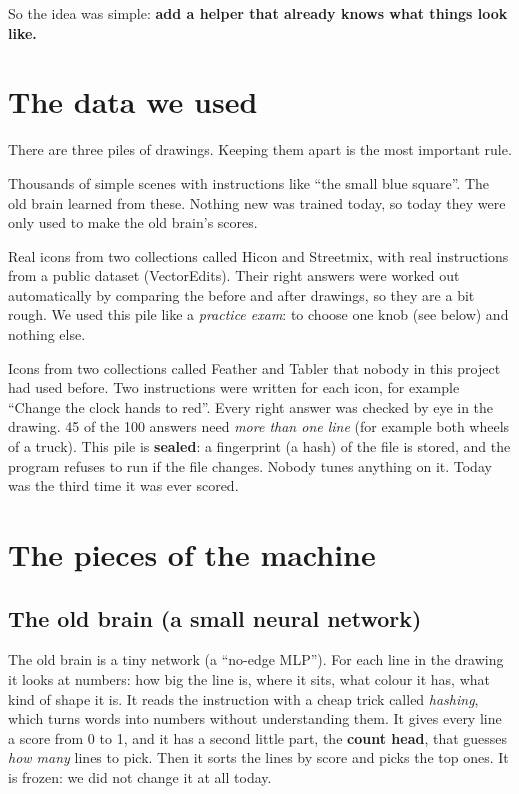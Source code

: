 \documentclass[11pt,a4paper]{article}
\begin{document}
So the idea was simple: \textbf{add a helper that already knows what things look like.}

\section*{The data we used}

There are three piles of drawings. Keeping them apart is the most important rule.

\begin{description}[leftmargin=1.6em, style=nextline]
  \item[1. Practice drawings (made up by a program).] Thousands of simple scenes with instructions like ``the small blue square''. The old brain learned from these. Nothing new was trained today, so today they were only used to make the old brain's scores.
  \item[2. The old test (80 drawings).] Real icons from two collections called Hicon and Streetmix, with real instructions from a public dataset (VectorEdits). Their right answers were worked out automatically by comparing the before and after drawings, so they are a bit rough. We used this pile like a \emph{practice exam}: to choose one knob (see below) and nothing else.
  \item[3. The real test (100 instructions on 50 icons).] Icons from two collections called Feather and Tabler that nobody in this project had used before. Two instructions were written for each icon, for example ``Change the clock hands to red''. Every right answer was checked by eye in the drawing. 45 of the 100 answers need \emph{more than one line} (for example both wheels of a truck). This pile is \textbf{sealed}: a fingerprint (a hash) of the file is stored, and the program refuses to run if the file changes. Nobody tunes anything on it. Today was the third time it was ever scored.
\end{description}

\section*{The pieces of the machine}

\subsection*{The old brain (a small neural network)}

The old brain is a tiny network (a ``no-edge MLP''). For each line in the drawing it looks at numbers: how big the line is, where it sits, what colour it has, what kind of shape it is.
It reads the instruction with a cheap trick called \emph{hashing}, which turns words into numbers without understanding them.
It gives every line a score from 0 to 1, and it has a second little part, the \textbf{count head}, that guesses \emph{how many} lines to pick.
Then it sorts the lines by score and picks the top ones.
It is frozen: we did not change it at all today.
\end{document}
